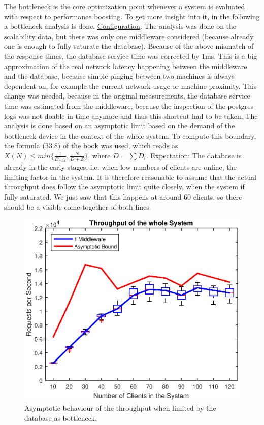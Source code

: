 \documentclass[11pt]{article}
\begin{document}
The bottleneck is the core optimization point whenever a system is evaluated with respect to performance boosting. To get more insight into it, in the following a bottleneck analysis is done.
\newline\underline{Configuration}: The analysis was done on the scalability data, but there was only one middleware considered (because already one is enough to fully saturate the database). Because of the above mismatch of the response times, the database service time was corrected by $1$ms. This is a big approximation of the real network latency happening between the middleware and the database, because simple pinging between two machines is always dependent on, for example the current network usage or machine proximity. This change was needed, because in the original measurements, the database service time was estimated from the middleware, because the inspection of the postgres logs was not doable in time anymore and thus this shortcut had to be taken. The analysis is done based on an asymptotic limit based on the demand of the bottleneck device in the context of the whole system. To compute this boundary, the formula (33.8) of the book was used, which reads as $X(N)\leq min\{\frac{1}{D_{max}},\frac{N}{D+Z}\}$, where $D=\sum D_i$.
\newline\underline{Expectation}: The database is already in the early stages, i.e. when low numbers of clients are online, the limiting factor in the system. It is therefore reasonable to assume that the actual throughput does follow the asymptotic limit quite closely, when the system if fully saturated. We just saw that this happens at around 60 clients, so there should be a visible come-together of both lines.
\begin{figure}[!htb]
\centering
\includegraphics[width=0.7\linewidth]{figures/bottleneck/bottleneck}
\caption{Asymptotic behaviour of the throughput when limited by the database as bottleneck.}
\label{fig:bottleneck}
\end{figure}
\end{document}
